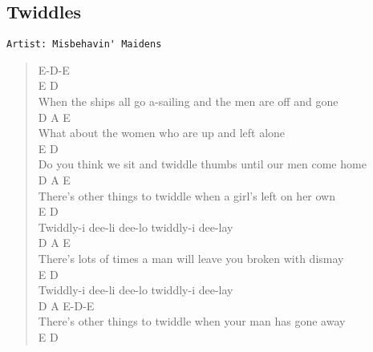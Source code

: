 \documentclass[11pt]{article}
\begin{document}
\subsection{Twiddles}
\label{sec:orga532fbe}
\begin{verbatim}
Artist: Misbehavin' Maidens
\end{verbatim}
\begin{verse}
E-D-E\\
\vspace*{1em}
\hspace*{9em}E                              D\\
When the ships all go a-sailing and the men are off and gone\\
D                            A           E\\
What about the women who are up and left alone\\
\hspace*{7em}E                               D\\
Do you think we sit and twiddle thumbs until our men come home\\
\hspace*{8em}D                              A                  E\\
There's other things to twiddle when a girl's left on her own\\
\vspace*{1em}
\vspace*{1em}
\vspace*{1em}
E                        D\\
Twiddly-i dee-li dee-lo twiddly-i dee-lay\\
\hspace*{9em}D                                 A           E\\
There's lots of times a man will leave you broken with dismay\\
E                         D\\
Twiddly-i dee-li dee-lo twiddly-i dee-lay\\
\hspace*{8em}D                                 A              E-D-E\\
There's other things to twiddle when your man has gone away\\
\vspace*{1em}
\vspace*{1em}
\vspace*{1em}
\hspace*{6em}E                         D\\

\end{verse}
\end{document}
